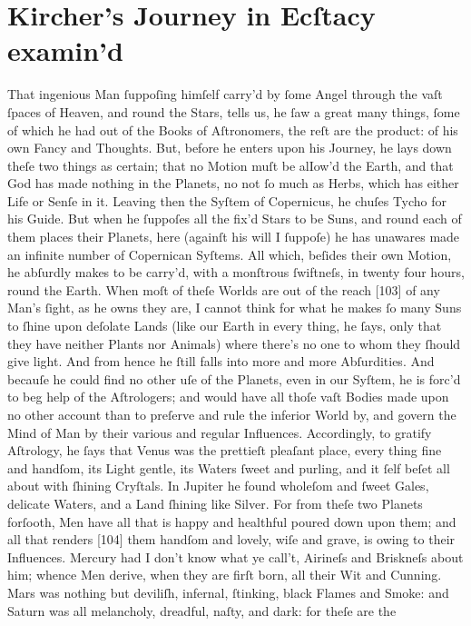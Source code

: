 \documentclass[letterpaper]{book}
\begin{document}
\section{Kircher's Journey in Ecſtacy examin'd}

That ingenious Man ſuppoſing himſelf carry'd by ſome Angel through the vaſt
ſpaces of Heaven, and round the Stars, tells us, he ſaw a great many things,
ſome of which he had out of the Books of Aſtronomers, the reſt are the
product: of his own Fancy and Thoughts. But, before he enters upon his
Journey, he lays down theſe two things as certain; that no Motion muſt be
alIow'd the Earth, and that God has made nothing in the Planets, no not ſo
much as Herbs, which has either Life or Senſe in it. Leaving then the Syſtem
of Copernicus, he chuſes Tycho for his Guide. But when he ſuppoſes all the
fix'd Stars to be Suns, and round each of them places their Planets, here
(againſt his will I ſuppoſe) he has unawares made an infinite number of
Copernican Syſtems. All which, beſides their own Motion, he abſurdly makes
to be carry'd, with a monſtrous ſwiftneſs, in twenty four hours, round the
Earth. When moſt of theſe Worlds are out of the reach [103] of any Man's
ſight, as he owns they are, I cannot think for what he makes ſo many Suns to
ſhine upon deſolate Lands (like our Earth in every thing, he ſays, only that
they have neither Plants nor Animals) where there's no one to whom they
ſhould give light. And from hence he ſtill falls into more and more
Abſurdities. And becauſe he could find no other uſe of the Planets, even in
our Syſtem, he is forc'd to beg help of the Aſtrologers; and would have all
thoſe vaſt Bodies made upon no other account than to preſerve and rule the
inferior World by, and govern the Mind of Man by their various and regular
Influences. Accordingly, to gratify Aſtrology, he ſays that Venus was the
prettieſt pleaſant place, every thing fine and handſom, its Light gentle,
its Waters ſweet and purling, and it ſelf beſet all about with ſhining
Cryſtals. In Jupiter he found wholeſom and ſweet Gales, delicate Waters, and a
Land ſhining like Silver. For from theſe two Planets forſooth, Men have all
that is happy and healthful poured down upon them; and all that renders
[104] them handſom and lovely, wiſe and grave, is owing to their Influences.
Mercury had I don't know what ye call't, Airineſs and Briskneſs about him;
whence Men derive, when they are firſt born, all their Wit and Cunning. Mars
was nothing but deviliſh, infernal, ſtinking, black Flames and Smoke: and
Saturn was all melancholy, dreadful, naſty, and dark: for theſe are the
\end{document}
